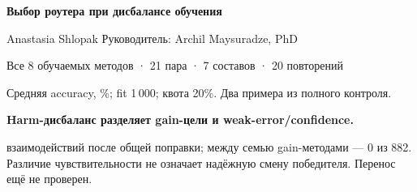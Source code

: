 \documentclass[aspectratio=169,11pt]{beamer}
\begin{document}
\begin{frame}[t,plain]
{\fontsize{14}{17}\selectfont\bfseries Выбор роутера при дисбалансе обучения}\par
\vspace{.12cm}
{\fontsize{8}{10}\selectfont Anastasia Shlopak \hfill Руководитель: Archil Maysuradze, PhD}\par
\vspace{.15cm}
{\small Все 8 обучаемых методов · 21 пара · 7 составов · 20 повторений}\par
\vspace{.08cm}\centering\fontsize{8}{9}\selectfont
\renewcommand{\arraystretch}{1.05}
\par
\vspace{.08cm}
{\fontsize{8}{10}\selectfont Средняя accuracy, \%; fit 1\,000; квота 20\%. Два примера из полного контроля.}\par
\vspace{.15cm}
{\small\color{accent}\bfseries Harm-дисбаланс разделяет gain-цели и weak-error/confidence.}\par
\vspace{.12cm}
{\fontsize{8}{10} взаимодействий после общей поправки; между семью gain-методами — 0 из 882.\newline
Различие чувствительности не означает надёжную смену победителя. Перенос ещё не проверен.}
\end{frame}
\end{document}
